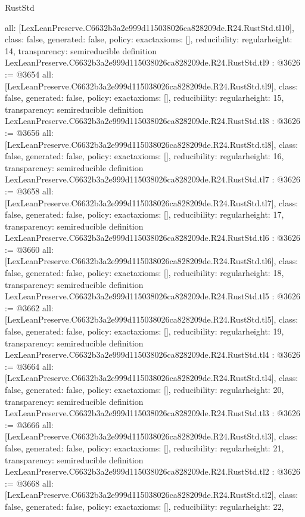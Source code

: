 \begin{lexlean}{RustStd}
\begin{coremodule}
{  all: [LexLeanPreserve.C6632b3a2e999d115038026ca828209de.R24.RustStd.tl10],
  class: false,
  generated: false,
  policy: exact{axioms: []},
  reducibility: regular{height: 14},
  transparency: semireducible
}
definition LexLeanPreserve.C6632b3a2e999d115038026ca828209de.R24.RustStd.tl9 : @3626 := @3654 {
  all: [LexLeanPreserve.C6632b3a2e999d115038026ca828209de.R24.RustStd.tl9],
  class: false,
  generated: false,
  policy: exact{axioms: []},
  reducibility: regular{height: 15},
  transparency: semireducible
}
definition LexLeanPreserve.C6632b3a2e999d115038026ca828209de.R24.RustStd.tl8 : @3626 := @3656 {
  all: [LexLeanPreserve.C6632b3a2e999d115038026ca828209de.R24.RustStd.tl8],
  class: false,
  generated: false,
  policy: exact{axioms: []},
  reducibility: regular{height: 16},
  transparency: semireducible
}
definition LexLeanPreserve.C6632b3a2e999d115038026ca828209de.R24.RustStd.tl7 : @3626 := @3658 {
  all: [LexLeanPreserve.C6632b3a2e999d115038026ca828209de.R24.RustStd.tl7],
  class: false,
  generated: false,
  policy: exact{axioms: []},
  reducibility: regular{height: 17},
  transparency: semireducible
}
definition LexLeanPreserve.C6632b3a2e999d115038026ca828209de.R24.RustStd.tl6 : @3626 := @3660 {
  all: [LexLeanPreserve.C6632b3a2e999d115038026ca828209de.R24.RustStd.tl6],
  class: false,
  generated: false,
  policy: exact{axioms: []},
  reducibility: regular{height: 18},
  transparency: semireducible
}
definition LexLeanPreserve.C6632b3a2e999d115038026ca828209de.R24.RustStd.tl5 : @3626 := @3662 {
  all: [LexLeanPreserve.C6632b3a2e999d115038026ca828209de.R24.RustStd.tl5],
  class: false,
  generated: false,
  policy: exact{axioms: []},
  reducibility: regular{height: 19},
  transparency: semireducible
}
definition LexLeanPreserve.C6632b3a2e999d115038026ca828209de.R24.RustStd.tl4 : @3626 := @3664 {
  all: [LexLeanPreserve.C6632b3a2e999d115038026ca828209de.R24.RustStd.tl4],
  class: false,
  generated: false,
  policy: exact{axioms: []},
  reducibility: regular{height: 20},
  transparency: semireducible
}
definition LexLeanPreserve.C6632b3a2e999d115038026ca828209de.R24.RustStd.tl3 : @3626 := @3666 {
  all: [LexLeanPreserve.C6632b3a2e999d115038026ca828209de.R24.RustStd.tl3],
  class: false,
  generated: false,
  policy: exact{axioms: []},
  reducibility: regular{height: 21},
  transparency: semireducible
}
definition LexLeanPreserve.C6632b3a2e999d115038026ca828209de.R24.RustStd.tl2 : @3626 := @3668 {
  all: [LexLeanPreserve.C6632b3a2e999d115038026ca828209de.R24.RustStd.tl2],
  class: false,
  generated: false,
  policy: exact{axioms: []},
  reducibility: regular{height: 22},
}
\end{coremodule}
\end{lexlean}
